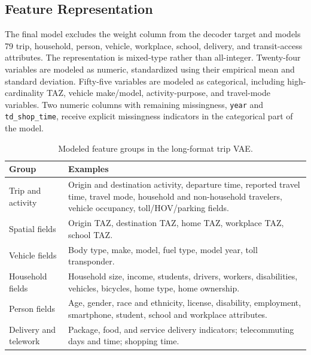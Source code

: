 \documentclass[3p,times,procedia]{elsarticle}
\begin{document}
\subsection{Feature Representation}
The final model excludes the weight column from the decoder target and models 79 trip, household, person, vehicle, workplace, school, delivery, and transit-access attributes. The representation is mixed-type rather than all-integer. Twenty-four variables are modeled as numeric, standardized using their empirical mean and standard deviation. Fifty-five variables are modeled as categorical, including high-cardinality TAZ, vehicle make/model, activity-purpose, and travel-mode variables. Two numeric columns with remaining missingness, \texttt{year} and \texttt{td\_shop\_time}, receive explicit missingness indicators in the categorical part of the model.

\begin{table}[H]
\centering
\caption{Modeled feature groups in the long-format trip VAE.}
\label{tab:features}
\footnotesize
\begin{tabularx}{\linewidth}{p{3.0cm}X}
\toprule
\textbf{Group} & \textbf{Examples} \\
\midrule
Trip and activity & Origin and destination activity, departure time, reported travel time, travel mode, household and non-household travelers, vehicle occupancy, toll/HOV/parking fields. \\
Spatial fields & Origin TAZ, destination TAZ, home TAZ, workplace TAZ, school TAZ. \\
Vehicle fields & Body type, make, model, fuel type, model year, toll transponder. \\
Household fields & Household size, income, students, drivers, workers, disabilities, vehicles, bicycles, home type, home ownership. \\
Person fields & Age, gender, race and ethnicity, license, disability, employment, smartphone, student, school and workplace attributes. \\
Delivery and telework & Package, food, and service delivery indicators; telecommuting days and time; shopping time. \\
\bottomrule
\end{tabularx}
\end{table}
\end{document}

